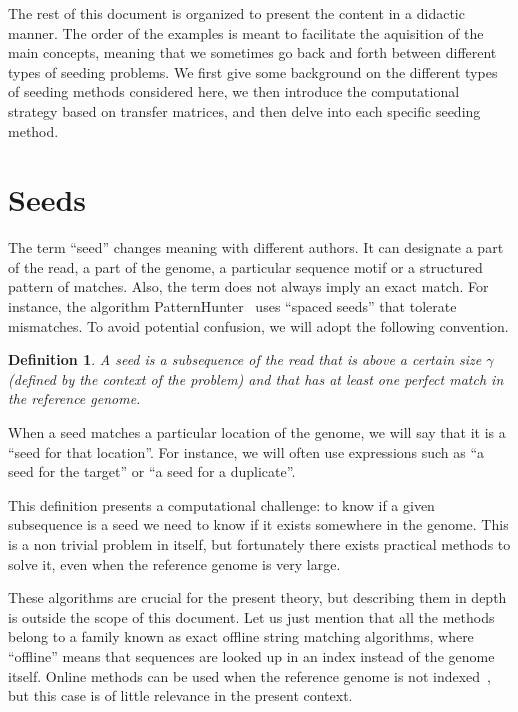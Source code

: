 \documentclass{article}
\newtheorem{definition}{Definition}
\begin{document}
The rest of this document is organized to present the content in a
didactic manner. The order of the examples is meant to facilitate the
aquisition of the main concepts, meaning that we sometimes go back and
forth between different types of seeding problems. We first give some
background on the different types of seeding methods considered here, we
then introduce the computational strategy based on transfer matrices, and
then delve into each specific seeding method.

\section{Seeds}

The term ``seed'' changes meaning with different authors. It can designate
a part of the read, a part of the genome, a particular sequence motif or a
structured pattern of matches. Also, the term does not always imply an
exact match. For instance, the algorithm PatternHunter~\cite{pmid11934743}
uses ``spaced seeds'' that tolerate mismatches. To avoid potential
confusion, we will adopt the following convention.

\begin{definition}
A seed is a subsequence of the read that is above a certain size $\gamma$
(defined by the context of the problem) and that has at least one perfect
match in the reference genome.
\end{definition}

When a seed matches a particular location of the genome, we will say that
it is a ``seed for that location''. For instance, we will often use
expressions such as ``a seed for the target'' or ``a seed for a
duplicate''.

This definition presents a computational challenge: to know if a given
subsequence is a seed we need to know if it exists somewhere in the
genome. This is a non trivial problem in itself, but fortunately there
exists practical methods to solve it, even when the reference genome is
very large.

These algorithms are crucial for the present theory, but describing them
in depth is outside the scope of this document. Let us just mention that
all the methods belong to a family known as exact offline string matching
algorithms, where ``offline'' means that sequences are looked up in an
index instead of the genome itself. Online methods can be used when the
reference genome is not indexed~\cite{faro2013exact}, but this case is of
little relevance in the present context.
\end{document}
